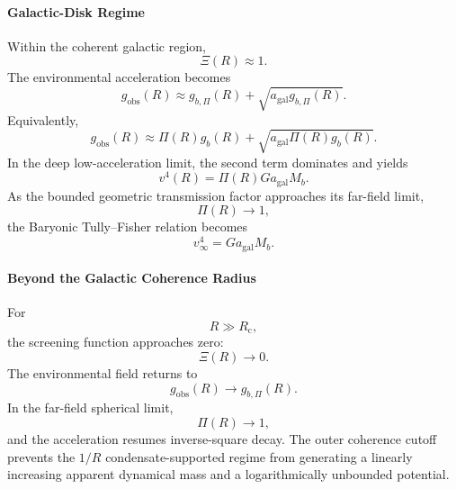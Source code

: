 \paragraph{Galactic-Disk Regime}
Within the coherent galactic region,
\begin{equation}
    \Xi(R) \approx 1.
\end{equation}
The environmental acceleration becomes
\begin{equation}
    g_{\mathrm{obs}}(R) \approx g_{b,\Pi}(R) + \sqrt{ a_{\mathrm{gal}}g_{b,\Pi}(R) }.
\end{equation}
Equivalently,
\begin{equation}
    g_{\mathrm{obs}}(R) \approx \Pi(R)g_b(R) + \sqrt{ a_{\mathrm{gal}}\Pi(R)g_b(R) }.
\end{equation}
In the deep low-acceleration limit, the second term dominates and yields
\begin{equation}
    v^4(R) = \Pi(R) G a_{\mathrm{gal}} M_b.
\end{equation}
As the bounded geometric transmission factor approaches its far-field limit,
\begin{equation}
    \Pi(R) \rightarrow 1,
\end{equation}
the Baryonic Tully--Fisher relation becomes
\begin{equation}
    v_\infty^4 = G a_{\mathrm{gal}} M_b.
\end{equation}

\paragraph{Beyond the Galactic Coherence Radius}
For
\begin{equation}
    R \gg R_{\mathrm{c}},
\end{equation}
the screening function approaches zero:
\begin{equation}
    \Xi(R) \rightarrow 0.
\end{equation}
The environmental field returns to
\begin{equation}
    g_{\mathrm{obs}}(R) \rightarrow g_{b,\Pi}(R).
\end{equation}
In the far-field spherical limit,
\begin{equation}
    \Pi(R) \rightarrow 1,
\end{equation}
and the acceleration resumes inverse-square decay. The outer coherence cutoff prevents the $1/R$ condensate-supported regime from generating a linearly increasing apparent dynamical mass and a logarithmically unbounded potential.

